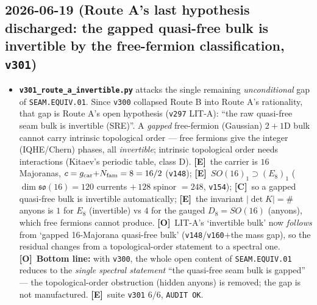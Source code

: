 \documentclass[11pt]{article}
\providecommand{\mE}{\textbf{[E]}}\providecommand{\mC}{\textbf{[C]}}
\providecommand{\mO}{\textbf{[O]}}\providecommand{\mX}{\textbf{[X]}}
\providecommand{\vref}[1]{\texttt{#1}}
\begin{document}
\subsection*{2026-06-19 (Route A's last hypothesis discharged: the gapped quasi-free bulk is invertible by the free-fermion classification, \texttt{v301})}
\begin{itemize}
\item \textbf{\texttt{v301\_route\_a\_invertible.py}} attacks the single remaining \emph{unconditional} gap of
  \texttt{SEAM.EQUIV.01}.  Since \vref{v300} collapsed Route B into Route A's rationality, that gap is Route A's
  open hypothesis (\vref{v297} LIT-A): ``the raw quasi-free seam bulk is invertible (SRE)''.  A \emph{gapped}
  free-fermion (Gaussian) $2{+}1$D bulk cannot carry intrinsic topological order --- free fermions give the
  integer (IQHE/Chern) phases, all \emph{invertible}; intrinsic topological order needs interactions (Kitaev's
  periodic table, class D).  \mE\ the carrier is $16$ Majoranas, $c=g_{\mathrm{car}}{+}N_{\mathrm{fam}}=8=16/2$
  (\vref{v148}); \mE\ $SO(16)_1\supset(E_8)_1$ ($\dim\mathfrak{so}(16)=120$ currents $+\,128$ spinor $=248$,
  \vref{v154}); \mC\ so a gapped quasi-free bulk is invertible automatically; \mE\ the invariant
  $|\det K|=\#$anyons is $1$ for $E_8$ (invertible) vs $4$ for the gauged $D_8{=}SO(16)$ (anyons), which free
  fermions cannot produce.  \mO\ LIT-A's `invertible bulk' now \emph{follows} from `gapped 16-Majorana quasi-free
  bulk' (\vref{v148}/\vref{v160}$+$the mass gap), so the residual changes from a topological-order statement to a
  spectral one.  \mO\ \textbf{Bottom line:} with \vref{v300}, the whole open content of \texttt{SEAM.EQUIV.01}
  reduces to the \emph{single spectral statement} ``the quasi-free seam bulk is gapped'' --- the topological-order
  obstruction (hidden anyons) is removed; the gap is not manufactured.  \mE\ suite \texttt{v301} $6/6$,
  \texttt{AUDIT OK}.
\end{itemize}
\end{document}
